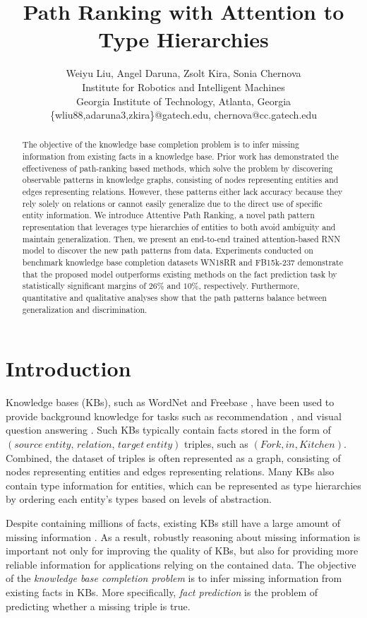 \documentclass[letterpaper]{article} %
\title{Path Ranking with Attention to Type Hierarchies}
\author{Weiyu Liu, Angel Daruna, Zsolt Kira, Sonia Chernova\\
Institute for Robotics and Intelligent Machines\\
Georgia Institute of Technology, Atlanta, Georgia\\
\{wliu88,adaruna3,zkira\}@gatech.edu, chernova@cc.gatech.edu
}
\begin{document}
\maketitle

\begin{abstract}
The objective of the knowledge base completion problem is to infer missing information from existing facts in a knowledge base. Prior work has demonstrated the effectiveness of path-ranking based methods, which solve the problem by discovering observable patterns in knowledge graphs, consisting of nodes representing entities and edges representing relations. However, these patterns either lack accuracy because they rely solely on relations or cannot easily generalize due to the direct use of specific entity information. We introduce Attentive Path Ranking, a novel path pattern representation that leverages type hierarchies of entities to both avoid ambiguity and maintain generalization. Then, we present an end-to-end trained attention-based RNN model to discover the new path patterns from data. Experiments conducted on benchmark knowledge base completion datasets WN18RR and FB15k-237 demonstrate that the proposed model outperforms existing methods on the fact prediction task by statistically significant margins of $26\%$ and $10\%$, respectively. Furthermore, quantitative and qualitative analyses show that the path patterns balance between generalization and discrimination.
\end{abstract}

\section{Introduction}

Knowledge bases (KBs), such as WordNet \cite{wordnet} and Freebase \cite{freebase}, have been used to provide background knowledge for tasks such as recommendation \cite{wang2018dkn}, and visual question answering \cite{aditya2018explicit}. Such KBs typically contain facts stored in the form of $(source\:entity,\, relation,\, target \:entity)$ triples, such as $(Fork, in, Kitchen)$. Combined, the dataset of triples is often represented as a graph, consisting of nodes representing entities and edges representing relations. Many KBs also contain type information for entities, which can be represented as type hierarchies by ordering each entity's types based on levels of abstraction.

Despite containing millions of facts, existing KBs still have a large amount of missing information \cite{min2013distant}. As a result, robustly reasoning about missing information is important not only for improving the quality of KBs, but also for providing more reliable information for applications relying on the contained data. The objective of the \textit{knowledge base completion problem} is to infer missing information from existing facts in KBs. More specifically, \textit{fact prediction} is the problem of predicting whether a missing triple is true. %
\end{document}
